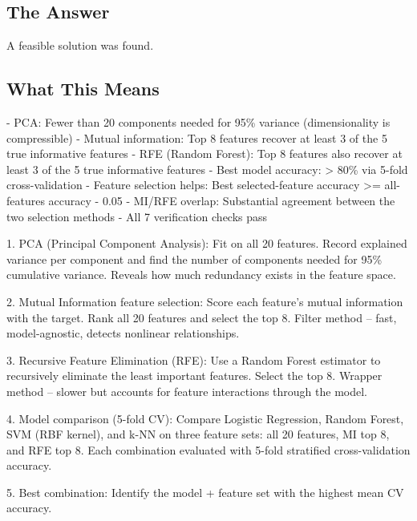 \documentclass[11pt, a4paper]{article}
\begin{document}
\subsection{The Answer}

\begin{polyainsight}[title={Bottom Line}]
A feasible solution was found.
\end{polyainsight}

\subsection{What This Means}

- PCA: Fewer than 20 components needed for 95\% variance (dimensionality is compressible)
- Mutual information: Top 8 features recover at least 3 of the 5 true informative features
- RFE (Random Forest): Top 8 features also recover at least 3 of the 5 true informative features
- Best model accuracy: > 80\% via 5-fold cross-validation
- Feature selection helps: Best selected-feature accuracy >= all-features accuracy - 0.05
- MI/RFE overlap: Substantial agreement between the two selection methods
- All 7 verification checks pass

1. PCA (Principal Component Analysis): Fit on all 20 features. Record explained variance per component and find the number of components needed for 95\% cumulative variance. Reveals how much redundancy exists in the feature space.

2. Mutual Information feature selection: Score each feature's mutual information with the target. Rank all 20 features and select the top 8. Filter method -- fast, model-agnostic, detects nonlinear relationships.

3. Recursive Feature Elimination (RFE): Use a Random Forest estimator to recursively eliminate the least important features. Select the top 8. Wrapper method -- slower but accounts for feature interactions through the model.

4. Model comparison (5-fold CV): Compare Logistic Regression, Random Forest, SVM (RBF kernel), and k-NN on three feature sets: all 20 features, MI top 8, and RFE top 8. Each combination evaluated with 5-fold stratified cross-validation accuracy.

5. Best combination: Identify the model + feature set with the highest mean CV accuracy.

\end{document}
